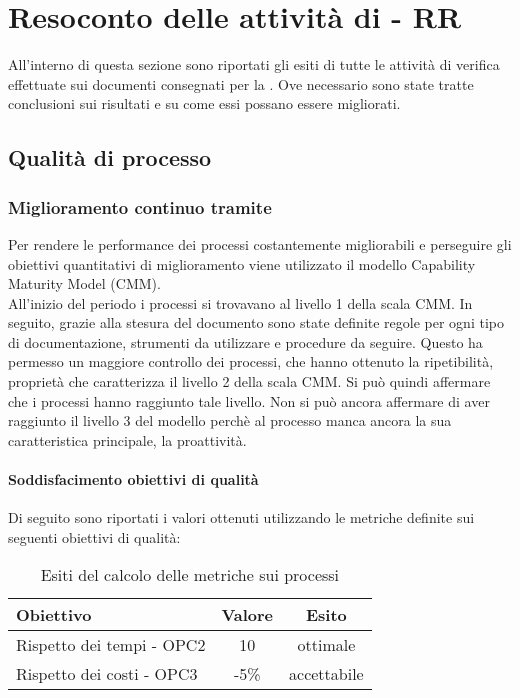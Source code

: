 \documentclass[PdQ.tex]{subfiles}
\begin{document}
\section{Resoconto delle attività di  - RR}
All'interno di questa sezione sono riportati gli esiti di tutte le attività di verifica effettuate sui documenti consegnati per la \RR{}. Ove necessario sono state tratte conclusioni sui risultati e su come essi possano essere migliorati.

\subsection{Qualità di processo}
		\subsubsection{Miglioramento continuo tramite }
		Per rendere le performance dei processi costantemente migliorabili e perseguire gli obiettivi quantitativi di miglioramento viene utilizzato il modello Capability Maturity Model (CMM).\\
		All'inizio del periodo i processi si trovavano al livello 1 della scala CMM. In seguito, grazie alla stesura del documento \NPdocRR{} sono state definite regole per ogni tipo di documentazione, strumenti da utilizzare e procedure da seguire. Questo ha permesso un maggiore controllo dei processi, che hanno ottenuto la ripetibilità, proprietà che caratterizza il livello 2 della scala CMM. Si può quindi affermare che i processi hanno raggiunto tale livello. Non si può ancora affermare di aver raggiunto il livello 3 del modello perchè al processo manca ancora la sua caratteristica principale, la proattività.\\

		\paragraph{Soddisfacimento obiettivi di qualità}
			Di seguito sono riportati i valori ottenuti utilizzando le metriche definite sui seguenti obiettivi di qualità:
			\begin{table}[h]
				\centering
				\begin{tabular}{l c c}
					\hline
					\rule[-0.3cm]{0cm}{0.8cm}
					\textbf{Obiettivo} & \textbf{Valore} & \textbf{Esito} \\
					\hline
					\rule[0cm]{0cm}{0.4cm}
					Rispetto dei tempi - OPC2 & 10 & ottimale \\
					\rule[0cm]{0cm}{0.4cm}
					Rispetto dei costi - OPC3 & -5\% & accettabile\\ 
					
					\hline
				\end{tabular}
				\caption{Esiti del calcolo delle metriche sui processi}
			\end{table}
		
\end{document}
